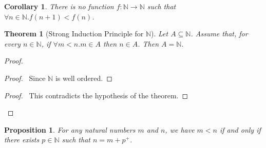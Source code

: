 \documentclass{book}
\let\qed\relax
\newtheorem{prop}[ax]{Proposition}
\newtheorem{cor}{Corollary}[ax]
\newtheorem{thm}[ax]{Theorem}
\theoremstyle{definition}
\begin{document}
\begin{cor}
There is no function $f : \mathbb{N} \rightarrow \mathbb{N}$ such that $\forall n \in \mathbb{N}. f(n+1) < f(n)$.
\end{cor}

\begin{thm}[Strong Induction Principle for $\mathbb{N}$]
Let $A \subseteq \mathbb{N}$. Assume that, for every $n \in \mathbb{N}$, if $\forall m < n. m \in A$ then $n \in A$. Then $A = \mathbb{N}$.
\end{thm}

\begin{proof}
\pf
{}
\begin{proof}
	\pf\ Since $\mathbb{N}$ is well ordered.
\end{proof}
\qedstep
\begin{proof}
	\pf\ This contradicts the hypothesis of the theorem.
\end{proof}
\qed
\end{proof}

\begin{prop}
For any natural numbers $m$ and $n$, we have $m < n$ if and only if there exists $p \in \mathbb{N}$ such that $n = m + p^+$.
\end{prop}
\end{document}

